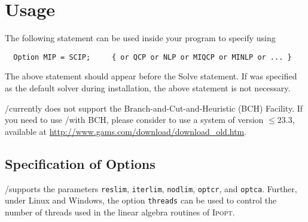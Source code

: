 \section{Usage}

The following statement can be used inside your \GAMS program to specify using \SCIP
\begin{verbatim}
  Option MIP = SCIP;     { or QCP or NLP or MIQCP or MINLP or ... }
\end{verbatim}

The above statement should appear before the Solve statement.
If \SCIP was specified as the default solver during \GAMS installation, the above statement is not necessary.

%

\GAMS/\SCIP currently does not support the \GAMS Branch-and-Cut-and-Heuristic (BCH) Facility.
If you need to use \GAMS/\SCIP with BCH, please consider to use a \GAMS system of version $\leq 23.3$, available at \url{http://www.gams.com/download/download_old.htm}.

\subsection{Specification of \SCIP Options}

\GAMS/\SCIP supports the \GAMS parameters \texttt{reslim}, \texttt{iterlim}, \texttt{nodlim}, \texttt{optcr}, and \texttt{optca}.
Further, under Linux and Windows, the option \texttt{threads} can be used to control the number of threads used in the linear algebra routines of \textsc{Ipopt}.

